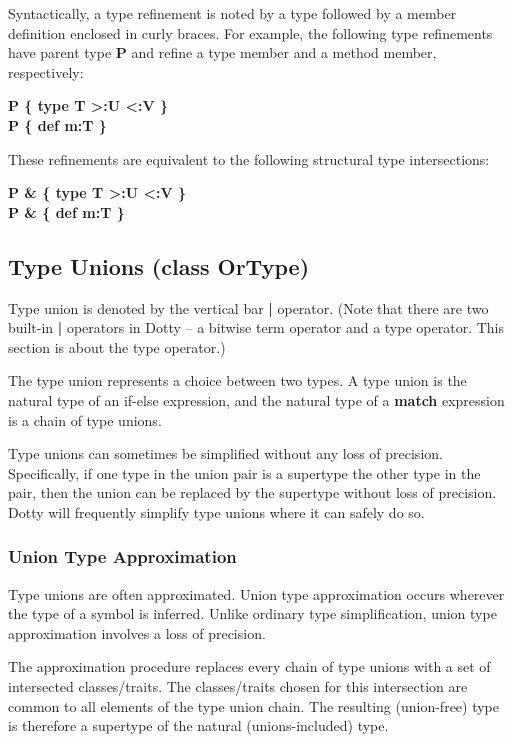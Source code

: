\documentclass[11pt]{report}
\newcommand{\cdf}{\bf\ttfamily} %
\newcommand{\cd}{\cdf\small}  %
\begin{document}
Syntactically, a type refinement is noted by a type followed by a member definition enclosed in curly braces. For example, the following type refinements have parent type {\cd P} and refine a type member and a method member, respectively:
\begin{center}
{\cd P \{ type T >:U <:V \}}\\
{\cd P \{ def m:T \}}
\end{center}
These refinements are equivalent to the following structural type intersections:
\begin{center}
{\cd P \& \{ type T >:U <:V \}}\\
{\cd P \& \{ def m:T \}}
\end{center}

\subsection{Type Unions (class OrType)} \label{sec:type-union}

Type union is denoted by the vertical bar {\cd |} operator. (Note that there are two built-in {\cd |} operators in Dotty -- a bitwise term operator and a type operator. This section is about the type operator.) 

The type union represents a choice between two types. A type union is the natural type of an if-else expression, and the natural type of a {\cd match} expression is a chain of type unions.

Type unions can sometimes be simplified without any loss of precision. Specifically, if one type in the union pair is a supertype the other type in the pair, then the union can be replaced by the supertype without loss of precision. Dotty will frequently simplify type unions where it can safely do so.

\subsubsection{Union Type Approximation}

Type unions are often approximated. Union type approximation occurs wherever the type of a symbol is inferred. Unlike ordinary type simplification, union type approximation involves a loss of precision.

The approximation procedure replaces every chain of type unions with a set of intersected classes/traits. The classes/traits chosen for this intersection are common to all elements of the type union chain. The resulting (union-free) type is therefore a supertype of the natural (unions-included) type.
\end{document}
